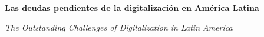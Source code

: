 
\renewcommand{\articuloidiomaxml}{es}
\renewcommand{\articulotitulo}{Las deudas pendientes de la digitalización en América Latina}
\renewcommand{\articuloautores}{Luciana Ferrer}
\renewcommand{\articulodoi}{10.2139/ssrn.2852942}
\renewcommand{\articulotipo}{EDITORIAL}
\renewcommand{\articulorevista}{Conexiones: Revista Latinoamericana de Sociedad y Tecnología}
\renewcommand{\articuloissne}{0327-7712}
\renewcommand{\articulovolumen}{01}
\renewcommand{\articulonumero}{01}
\renewcommand{\articulofecha}{ 2026}
\renewcommand{\articulopagina}{1}

\setcounter{page}{1}
\thispagestyle{firstpage}

\noindent\begin{minipage}[t]{\dimexpr\textwidth+\marginparsep+\marginparwidth\relax}%
{\sffamily\bfseries\Large\articulotitulo\par}%
\end{minipage}\par
\vspace{3mm}%
\renewcommand{\articulotitulotrans}{The Outstanding Challenges of Digitalization in Latin America}
\noindent\begin{minipage}[t]{\dimexpr\textwidth+\marginparsep+\marginparwidth\relax}%
{\sffamily\itshape\normalsize\articulotitulotrans\par}%
\end{minipage}\par
\vspace{4mm}%

